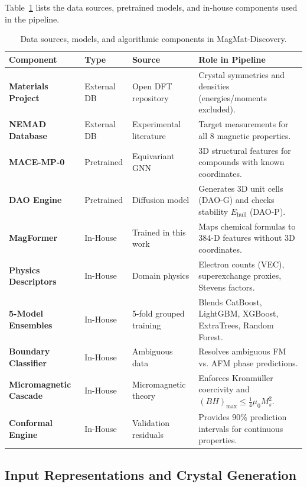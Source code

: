 \documentclass[11pt,a4paper]{article}
\begin{document}
Table~\ref{tab:provenance} lists the data sources, pretrained models, and in-house components used in the pipeline.

\begin{table}[!t]
\centering
\small\sffamily
\caption{Data sources, models, and algorithmic components in MagMat-Discovery.}
\label{tab:provenance}
\begin{tabularx}{\textwidth}{>{\bfseries}p{4.0cm} p{2.2cm} p{3.6cm} >{\raggedright\arraybackslash}X}
\toprule
\textbf{\color{navyblue}Component} & \textbf{\color{navyblue}Type} & \textbf{\color{navyblue}Source} & \textbf{\color{navyblue}Role in Pipeline} \\
\midrule
Materials Project \cite{materials_project} & External DB & Open DFT repository & Crystal symmetries and densities (energies/moments excluded). \\
NEMAD Database \cite{nemad2025} & External DB & Experimental literature & Target measurements for all 8 magnetic properties. \\
MACE-MP-0 \cite{mace2022} & Pretrained & Equivariant GNN & 3D structural features for compounds with known coordinates. \\
DAO Engine \cite{dao2026} & Pretrained & Diffusion model & Generates 3D unit cells (DAO-G) and checks stability $E_{\text{hull}}$ (DAO-P). \\
\midrule
MagFormer & In-House & Trained in this work & Maps chemical formulas to 384-D features without 3D coordinates. \\
Physics Descriptors & In-House & Domain physics & Electron counts (VEC), superexchange proxies, Stevens factors. \\
5-Model Ensembles & In-House & 5-fold grouped training & Blends CatBoost, LightGBM, XGBoost, ExtraTrees, Random Forest. \\
Boundary Classifier & In-House & Ambiguous data & Resolves ambiguous FM vs. AFM phase predictions. \\
Micromagnetic Cascade & In-House & Micromagnetic theory \cite{kronmuller2003} & Enforces Kronmüller coercivity and $(BH)_{\max} \le \frac{1}{4}\mu_0 M_s^2$. \\
Conformal Engine & In-House & Validation residuals \cite{vovk2005} & Provides 90\% prediction intervals for continuous properties. \\
\bottomrule
\end{tabularx}
\end{table}

\subsection{Input Representations and Crystal Generation}
\label{sec:physics_descriptors}
\label{sec:magformer_architecture}
\label{sec:dao_screening}
\end{document}
